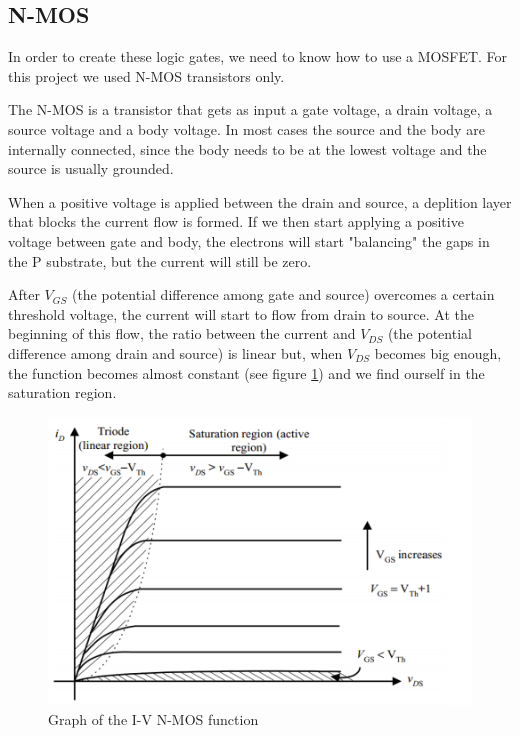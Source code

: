 \documentclass{article}
\begin{document}
\subsection{N-MOS}

In order to create these logic gates, we need to know how to use a MOSFET. For this project we used N-MOS transistors only.

\vspace{3mm}

The N-MOS is a transistor that gets as input a gate voltage, a drain voltage, a source voltage and a body voltage. In most cases the source and the body are internally connected, since the body needs to be at the lowest voltage and the source is usually grounded.

\vspace{3mm}

When a positive voltage is applied between the drain and source, a deplition layer that blocks the current flow is formed. 
If we then start applying a positive voltage between gate and body, the electrons will start "balancing" the gaps in the P substrate, but the current will still be zero.

\vspace{3mm}

After $V_{GS}$ (the potential difference among gate and source) overcomes a certain threshold voltage, the current will start to flow from drain to source. At the beginning of this flow, the ratio between the current and $V_{DS}$ (the potential difference among drain and source) is linear but, when $V_{DS}$ becomes big enough, the function becomes almost constant (see figure \ref{NMOS_Function}) and we find ourself in the saturation region.

\begin{figure}[h]
    \centering
    \includegraphics[scale=.65]{IM_NMOS_Function.png}
    \caption{Graph of the I-V N-MOS function}
    \label{NMOS_Function}
\end{figure}
\end{document}
